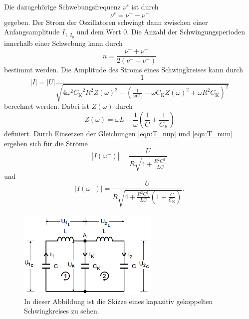 Die dazugehörige Schwebungsfrequenz $\nu^s$ ist durch 
\begin{equation}
    \label{eqn:T_Schwebung}
    \nu^s = \nu^- -\nu^+
\end{equation}
gegeben. Der Strom der Oszillatoren schwingt dann zwischen einer Anfangsamplitude $I_{{1,2}_0}$ und dem Wert $0$.
Die Anzahl der Schwingungsperioden innerhalb einer Schwebung kann durch
\begin{equation}
    \label{eqn:T_n}
    n = \frac{\nu^+ + \nu^-}{2\left(\nu^- - \nu^+\right)} 
\end{equation}
bestimmt werden.  
Die Amplitude des Stroms eines Schwingkreises kann durch 
\begin{equation}
    \label{eqn:STROM}
    |I| = |U|\frac{1}{\sqrt{4\omega^2{C_\text{K}}^2R^2Z(\omega)^2+\left(\frac{1}{\omega C_\text{K}}-\omega C_\text{K}Z(\omega)^2+\omega R^2C_\text{K}\right)^2}}
\end{equation}
berechnet werden.
Dabei ist $Z(\omega)$ durch
\begin{equation*}
    Z(\omega) = \omega L - \frac{1}{\omega}\left(\frac{1}{C} + \frac{1}{C_\text{K}}\right)
\end{equation*}
definiert.
Durch Einsetzen der Gleichungen \eqref{eqn:T_nup} und \eqref{eqn:T_num} ergeben sich für die Ströme
\begin{equation}
    \label{eqn:Ip_theo}
    |I(\omega^+)| = \frac{U}{R\sqrt{4 + \frac{R^2C_\text{K}^2}{LC}}}
\end{equation}
und 
\begin{equation}
    \label{eqn:Im_theo}
    |I(\omega^-)| = \frac{U}{R\sqrt{4 + \frac{R^2C_\text{K}^2}{LC}\left(1 + \frac{C}{C_\text{K}}\right)}}.
\end{equation}
\begin{figure}
    \centering
    \includegraphics[width = 0.6\textwidth]{content/SkizzegekoppelterSchwingkreis.PNG}
    \caption{In dieser Abbildung ist die Skizze eines kapazitiv gekoppelten Schwingkreises zu sehen. \cite{v355}}
    \label{fig:T_skgS}
\end{figure}
